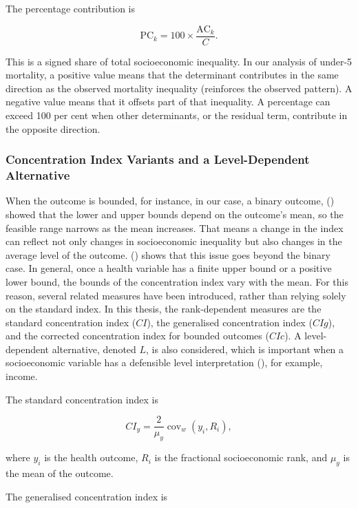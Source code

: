 \documentclass[
  11pt,
  a4paper,
]{article}
\begin{document}
The percentage contribution is

\[
\text{PC}_k = 100 \times \frac{\text{AC}_k}{C}.
\]

This is a signed share of total socioeconomic inequality. In our
analysis of under-5 mortality, a positive value means that the
determinant contributes in the same direction as the observed mortality
inequality (reinforces the observed pattern). A negative value means
that it offsets part of that inequality. A percentage can exceed 100 per
cent when other determinants, or the residual term, contribute in the
opposite direction.

\subsubsection{Concentration Index Variants and a Level-Dependent
Alternative}\label{sec-ci-extensions}

When the outcome is bounded, for instance, in our case, a binary
outcome, () showed that
the lower and upper bounds depend on the outcome's mean, so the feasible
range narrows as the mean increases. That means a change in the index
can reflect not only changes in socioeconomic inequality but also
changes in the average level of the outcome.
() shows that
this issue goes beyond the binary case. In general, once a health
variable has a finite upper bound or a positive lower bound, the bounds
of the concentration index vary with the mean. For this reason, several
related measures have been introduced, rather than relying solely on the
standard index. In this thesis, the rank-dependent measures are the
standard concentration index (\(CI\)), the generalised concentration
index (\(CIg\)), and the corrected concentration index for bounded
outcomes (\(CIc\)). A level-dependent alternative, denoted \(L\), is
also considered, which is important when a socioeconomic variable has a
defensible level interpretation
(), for example, income.

The standard concentration index is

\[
CI_y = \frac{2}{\mu_y}\operatorname{cov}_w(y_i, R_i),
\]

where \(y_i\) is the health outcome, \(R_i\) is the fractional
socioeconomic rank, and \(\mu_y\) is the mean of the outcome.

The generalised concentration index is
\end{document}
